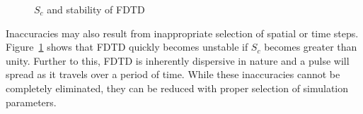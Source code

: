 \begin{figure}[H]
\centering
\mbox{\quad{}}
\caption{$S_c$ and stability of FDTD}
\label{Unstable-FDTD}
\end{figure}
Inaccuracies may also result from inappropriate selection of spatial or time steps. Figure~\ref{Unstable-FDTD} shows that FDTD quickly becomes unstable if $S_c$ becomes greater than unity. Further to this, FDTD is inherently dispersive in nature and a pulse will spread as it travels over a period of time. While these inaccuracies cannot be completely eliminated, they can be reduced with proper selection of simulation parameters.
